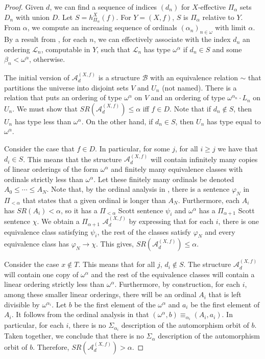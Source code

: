 \documentclass{article}
\begin{document}
\begin{proof}

Given $d$, we can find a sequence of indices $(d_n)$ for $X$-effective $\Pi_{\alpha}$ sets $D_n$ with union $D$.  Let $S = h^X_{\Pi_\alpha}(f)$.  For $Y = (X,f)$, $S$ is $\Pi_\alpha$ relative to $Y$.  From $\alpha$, we compute an increasing sequence of ordinals $(\alpha_n)_{n\in\omega}$ with limit $\alpha$.  By a result from \cite{AK}, for each $n$, we can effectively associate with the index $d_n$ an ordering $\mathcal{L}_n$, computable in $Y$, such that $\mathcal{L}_n$ has type $\omega^\alpha$ if $d_n\in S$ and some $\beta_n < \omega^\alpha$, otherwise.  

The initial version of $\mathcal{A}^{(X,f)}_d$ is a structure $\mathcal{B}$ with an equivalence relation $\sim$ that partitions the universe into disjoint sets $V$ and $U_n$ (not named).  There is a relation that puts an ordering of type $\omega^\alpha$ on $V$ and an ordering of type $\omega^{\alpha_n}\cdot L_n$ on $U_n$. 
We must show that $SR(\mathcal{A}^{(X,f)}_d)\leq\alpha$ iff $f\in D$. 
Note that if $d_n\notin S$, then $U_n$ has type less than $\omega^\alpha$.  
On the other hand, if $d_n\in S$, then $U_n$ has type equal to $\omega^\alpha$.  

Consider the case that $f\in D$.
In particular, for some $j$, for all $i\geq j$ we have that $d_i\in S$.
 This means that the structure $\mathcal{A}^{(X,f)}_d$ will contain infinitely many copies of linear orderings of the form $\omega^{\alpha}$ and finitely many equivalence classes with ordinals strictly less than $\omega^\alpha$.
 Let these finitely many ordinals be denoted $A_0\leq\cdots\leq A_N$.
    Note that, by the ordinal analysis in \cite{Ash86}, there is a sentence $\varphi_N$ in $\Pi_{<\alpha}$ that states that a given ordinal is longer than $A_N$.
    Furthermore, each $A_i$ has $SR(A_i)<\alpha$, so it has a $\Pi_{<\alpha}$ Scott sentence $\psi_i$ and $\omega^\alpha$ has a $\Pi_{\alpha+1}$ Scott sentence $\chi$.
We obtain a $\Pi_{\alpha+1}$ $\mathcal{A}^{(X,f)}_d$ by expressing that for each $i$, there is one equivalence class satisfying $\psi_i$, the rest of the classes satisfy $\varphi_N$ and every equivalence class has $\varphi_N\to \chi$.
This gives, $SR(\mathcal{A}^{(X,f)}_d)\leq\alpha$.


    Consider the case $x\not\in T$.
    This means that for all $j$, $d_i\not\in S$.
    The structure $\mathcal{A}^{(X,f)}_d$ will contain one copy of $\omega^\alpha$ and the rest of the equivalence classes will contain a linear ordering strictly less than $\omega^\alpha$.
    Furthermore, by construction, for each $i$, among these smaller linear orderings, there will be an ordinal $A_i$ that is left divisible by $\omega^{\alpha_i}$.
    Let $b$ be the first element of the $\omega^\alpha$ and $a_i$ be the first element of $A_i$.
    It follows from the ordinal analysis in \cite{Ash86} that $(\omega^\alpha,b)\equiv_{\alpha_i} (A_i,a_i)$.
    In particular, for each $i$, there is no $\Sigma_{\alpha_i}$ description of the automorphism orbit of $b$.
    Taken together, we conclude that there is no $\Sigma_{\alpha}$ description of the automorphism orbit of $b$.
    Therefore, $SR(\mathcal{A}^{(X,f)}_d)>\alpha$.


\end{proof}
\end{document}
